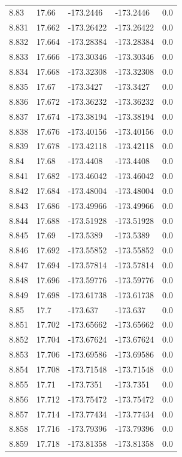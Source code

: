 \begin{tabular}{lllll}
8.83 & 17.66 & -173.2446 & -173.2446 & 0.0 \\
8.831 & 17.662 & -173.26422 & -173.26422 & 0.0 \\
8.832 & 17.664 & -173.28384 & -173.28384 & 0.0 \\
8.833 & 17.666 & -173.30346 & -173.30346 & 0.0 \\
8.834 & 17.668 & -173.32308 & -173.32308 & 0.0 \\
8.835 & 17.67 & -173.3427 & -173.3427 & 0.0 \\
8.836 & 17.672 & -173.36232 & -173.36232 & 0.0 \\
8.837 & 17.674 & -173.38194 & -173.38194 & 0.0 \\
8.838 & 17.676 & -173.40156 & -173.40156 & 0.0 \\
8.839 & 17.678 & -173.42118 & -173.42118 & 0.0 \\
8.84 & 17.68 & -173.4408 & -173.4408 & 0.0 \\
8.841 & 17.682 & -173.46042 & -173.46042 & 0.0 \\
8.842 & 17.684 & -173.48004 & -173.48004 & 0.0 \\
8.843 & 17.686 & -173.49966 & -173.49966 & 0.0 \\
8.844 & 17.688 & -173.51928 & -173.51928 & 0.0 \\
8.845 & 17.69 & -173.5389 & -173.5389 & 0.0 \\
8.846 & 17.692 & -173.55852 & -173.55852 & 0.0 \\
8.847 & 17.694 & -173.57814 & -173.57814 & 0.0 \\
8.848 & 17.696 & -173.59776 & -173.59776 & 0.0 \\
8.849 & 17.698 & -173.61738 & -173.61738 & 0.0 \\
8.85 & 17.7 & -173.637 & -173.637 & 0.0 \\
8.851 & 17.702 & -173.65662 & -173.65662 & 0.0 \\
8.852 & 17.704 & -173.67624 & -173.67624 & 0.0 \\
8.853 & 17.706 & -173.69586 & -173.69586 & 0.0 \\
8.854 & 17.708 & -173.71548 & -173.71548 & 0.0 \\
8.855 & 17.71 & -173.7351 & -173.7351 & 0.0 \\
8.856 & 17.712 & -173.75472 & -173.75472 & 0.0 \\
8.857 & 17.714 & -173.77434 & -173.77434 & 0.0 \\
8.858 & 17.716 & -173.79396 & -173.79396 & 0.0 \\
8.859 & 17.718 & -173.81358 & -173.81358 & 0.0 \\

\end{tabular}
